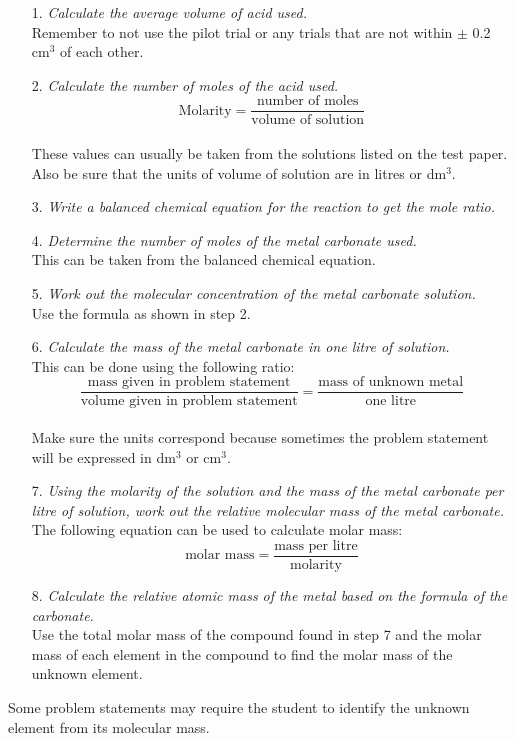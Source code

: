 \begin{enumerate}
\item[1.] \textit{Calculate the average volume of acid used.}\\
Remember to not use the pilot trial or any trials that are not within $\pm$ 0.2 cm$^3$ of each other.
\item[2.] \textit{Calculate the number of moles of the acid used.}\\
$$\text{Molarity} = \frac{\text{number of moles}}{\text{volume of solution}}$$\\
These values can usually be taken from the solutions listed on the test paper. Also be sure that the units of volume of solution are in litres or dm$^3$.
\item[3.] \textit{Write a balanced chemical equation for the reaction to get the mole ratio.}
\item[4.] \textit{Determine the number of moles of the metal carbonate used.}\\
This can be taken from the balanced chemical equation.
\item[5.] \textit{Work out the molecular concentration of the metal carbonate solution.}\\
Use the formula as shown in step 2.
\item[6.] \textit{Calculate the mass of the metal carbonate in one litre of solution.}\\
This can be done using the following ratio:\\
$$\frac{\text{mass given in problem statement}}{\text{volume given in problem statement}} = \frac{\text{mass of unknown metal}}{\text{one litre}}$$\\
Make sure the units correspond because sometimes the problem statement will be expressed in dm$^3$ or cm$^3$.
\item[7.] \textit{Using the molarity of the solution and the mass of the metal carbonate per litre of solution, work out the relative molecular mass of the metal carbonate.}\\
The following equation can be used to calculate molar mass:\\
$$\text{molar mass} = \frac{\text{mass per litre}}{\text{molarity}}$$
\item[8.] \textit{Calculate the relative atomic mass of the metal based on the formula of the carbonate.}\\
Use the total molar mass of the compound found in step 7 and the molar mass of each element in the compound to find the molar mass of the unknown element.
\end{enumerate}
Some problem statements may require the student to identify the unknown element from its molecular mass.

